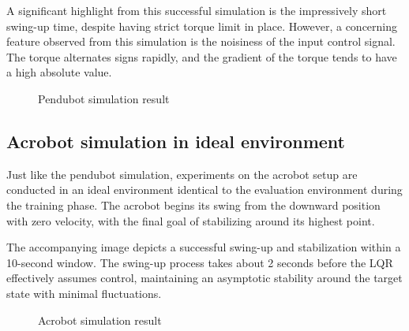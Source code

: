 A significant highlight from this successful simulation is the impressively short swing-up time, despite having strict torque limit in place. However, a concerning feature observed from this simulation is the noisiness of the input control signal. The torque alternates signs rapidly, and the gradient of the torque tends to have a high absolute value.

\begin{figure}[H]
    \centering
    \caption{Pendubot simulation result}
    \label{fig:ideal_simulation_pendubot}
\end{figure}

\subsection{Acrobot simulation in ideal environment}

Just like the pendubot simulation, experiments on the acrobot setup are conducted in an ideal environment identical to the evaluation environment during the training phase. The acrobot begins its swing from the downward position with zero velocity, with the final goal of stabilizing around its highest point.

The accompanying image depicts a successful swing-up and stabilization within a 10-second window. The swing-up process takes about 2 seconds before the LQR effectively assumes control, maintaining an asymptotic stability around the target state with minimal fluctuations.

\begin{figure}[H]
    \centering
    \caption{Acrobot simulation result}
    \label{fig:ideal_simulation_acrobot}
\end{figure}

